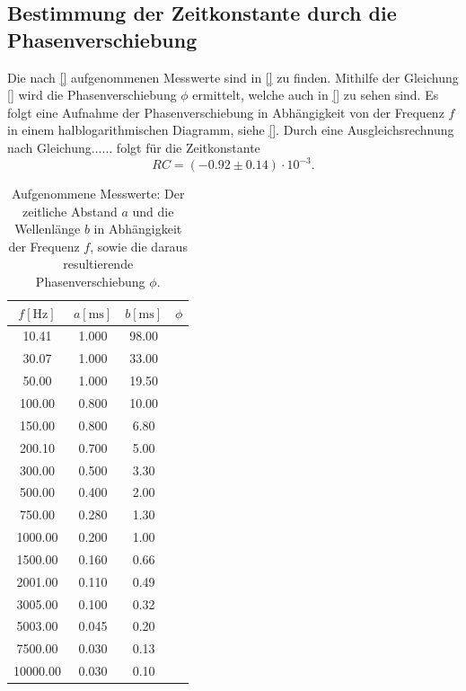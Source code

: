 \subsection{Bestimmung der Zeitkonstante durch die Phasenverschiebung}
\label{subsec:Aufgabe_C}
Die nach \autoref{} aufgenommenen Messwerte sind in \autoref{} zu finden.
Mithilfe der Gleichung \autoref{} wird die Phasenverschiebung $\phi$ ermittelt, welche auch in \autoref{} zu sehen sind.
Es folgt eine Aufnahme der Phasenverschiebung in Abhängigkeit von der Frequenz $f$ in einem halblogarithmischen Diagramm, siehe \autoref{}.
Durch eine Ausgleichsrechnung nach Gleichung...... folgt für die Zeitkonstante
\begin{equation*}
  RC = (-0.92 \pm 0.14) \cdot 10^{-3}.
\end{equation*}

\begin{table}
  \centering
  \caption{Aufgenommene Messwerte: Der zeitliche  Abstand $a$ und die Wellenlänge $b$ in Abhängigkeit der Frequenz $f$, sowie die daraus resultierende Phasenverschiebung $\phi$.}
  \label{tab:data_c}
  \begin{tabular}{c c c c}
    \toprule
    $f [\si{\hertz}]$ & $a [\si{\milli\second}]$ & $b [\si{\milli\second}]$ & $\phi$ \\
    \midrule
    10.41       &     1.000     &   98.00   &   \\
    30.07       &     1.000     &   33.00   &   \\
    50.00       &     1.000     &   19.50   &   \\
    100.00      &     0.800     &   10.00   &   \\
    150.00      &     0.800     &    6.80   &   \\
    200.10      &     0.700     &    5.00   &   \\
    300.00      &     0.500     &    3.30   &   \\
    500.00      &     0.400     &    2.00   &   \\
    750.00      &     0.280     &    1.30   &   \\
    1000.00     &     0.200     &    1.00   &   \\
    1500.00     &     0.160     &    0.66   &   \\
    2001.00     &     0.110     &    0.49   &   \\
    3005.00     &     0.100     &    0.32   &   \\
    5003.00     &     0.045     &    0.20   &   \\
    7500.00     &     0.030     &    0.13   &   \\
    10000.00    &     0.030     &    0.10   &   \\
    \bottomrule
  \end{tabular}
\end{table}

